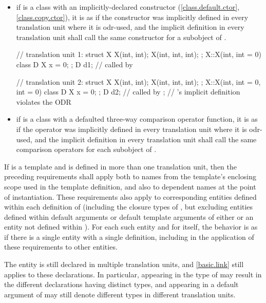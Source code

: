 \begin{itemize}
\item if  is a class with an implicitly-declared
constructor (\ref{class.default.ctor}, \ref{class.copy.ctor}),
it is as if the constructor was
implicitly defined in every translation unit where it is odr-used, and the
implicit definition in every translation unit shall call the same
constructor for a subobject of .
\begin{example}
\begin{codeblock}
// translation unit 1:
struct X {
  X(int, int);
  X(int, int, int);
};
X::X(int, int = 0) { }
class D {
  X x = 0;
};
D d1;                           //  called by 

// translation unit 2:
struct X {
  X(int, int);
  X(int, int, int);
};
X::X(int, int = 0, int = 0) { }
class D {
  X x = 0;
};
D d2;                           //  called by ;
                                // 's implicit definition violates the ODR
\end{codeblock}
\end{example}

\item if  is a class with
a defaulted three-way comparison operator function,
it is as if the operator was
implicitly defined in every translation unit where it is odr-used, and the
implicit definition in every translation unit shall call the same
comparison operators for each subobject of .
\end{itemize}
If  is a template and is defined in more than one
translation unit, then the preceding requirements
shall apply both to names from the template's enclosing scope used in the
template definition, and also to dependent names at
the point of instantiation.
These requirements also apply to corresponding entities
defined within each definition of 
(including the closure types of ,
but excluding entities defined within default arguments or
default template arguments of either  or
an entity not defined within ).
For each such entity and for  itself,
the behavior is as if there is a single entity with a single definition,
including in the application of these requirements to other entities.
\begin{note}
The entity is still declared in multiple translation units, and \ref{basic.link}
still applies to these declarations. In particular,
appearing in the type of  may result
in the different declarations having distinct types, and
 appearing in a default argument of 
may still denote different types in different translation units.
\end{note}
